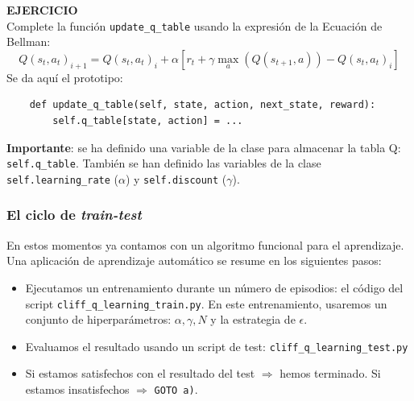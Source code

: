 \documentclass{article}
\begin{document}





\begin{exercise}
\textbf{EJERCICIO}\\
    Complete la función \texttt{update\_q\_table} usando la expresión de la Ecuación de Bellman:
    \begin{equation}
Q(s_t,a_t)_{i+1} = Q(s_t,a_t)_{i} + \alpha [r_t + \gamma 
\max_a(Q(s_{t+1},a))- Q(s_t,a_t)_{i}]  
\end{equation}
Se da aquí el prototipo:
    \begin{verbatim}
    def update_q_table(self, state, action, next_state, reward):
        self.q_table[state, action] = ...
    \end{verbatim}
    \textbf{Importante}: se ha definido una variable de la clase para almacenar la tabla Q: \texttt{self.q\_table}. También se han definido las variables de la clase \texttt{self.learning\_rate} ($\alpha$) y \texttt{self.discount} ($\gamma$).
\end{exercise}

\subsubsection{El ciclo de \textit{train-test}}
En estos momentos ya contamos con un algoritmo funcional para el aprendizaje. Una aplicación de aprendizaje automático se resume en los siguientes pasos:
\begin{itemize}
    \item[a)] Ejecutamos un entrenamiento durante un número de episodios: el código del script \texttt{cliff\_q\_learning\_train.py}. En este entrenamiento, usaremos un conjunto de hiperparámetros: $\alpha, \gamma, N$ y la estrategia de $\epsilon$.
    \item[b)] Evaluamos el resultado usando un script de test: \texttt{cliff\_q\_learning\_test.py}
    \item[c)] Si estamos satisfechos con el resultado del test $\Longrightarrow$ hemos terminado. Si estamos insatisfechos $\Longrightarrow$ \texttt{GOTO a)}.
\end{itemize}
\end{document}
